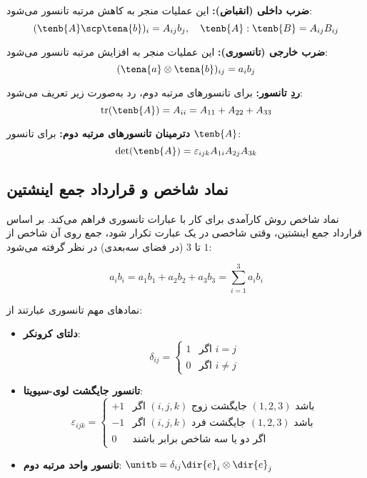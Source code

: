 \textbf{ضرب داخلی (انقباض):} این عملیات منجر به کاهش مرتبه تانسور می‌شود:
\begin{equation}
	(\tenb{A} \scp \tena{b})_i = A_{ij} b_j, \quad \tenb{A} : \tenb{B} = A_{ij} B_{ij}
\end{equation}

\textbf{ضرب خارجی (تانسوری):} این عملیات منجر به افزایش مرتبه تانسور می‌شود:
\begin{equation}
	(\tena{a} \otimes \tena{b})_{ij} = a_i b_j
\end{equation}

\textbf{ردِ تانسور:} برای تانسورهای مرتبه دوم، رد به‌صورت زیر تعریف می‌شود:
\begin{equation}
	\text{tr}(\tenb{A}) = A_{ii} = A_{11} + A_{22} + A_{33}
\end{equation}

\textbf{دترمینان تانسورهای مرتبه دوم:} برای تانسور $\tenb{A}$:
\begin{equation}
	\det(\tenb{A}) = \varepsilon_{ijk} A_{1i} A_{2j} A_{3k}
\end{equation}

\subsection{نماد شاخص و قرارداد جمع اینشتین}

نماد شاخص روش کارآمدی برای کار با عبارات تانسوری فراهم می‌کند. بر اساس قرارداد جمع اینشتین، وقتی شاخصی در یک عبارت تکرار شود، جمع روی آن شاخص از $1$ تا $3$ (در فضای سه‌بعدی) در نظر گرفته می‌شود:

\begin{equation}
	a_i b_i = a_1 b_1 + a_2 b_2 + a_3 b_3 = \sum_{i=1}^{3} a_i b_i
\end{equation}

نمادهای مهم تانسوری عبارتند از:

\begin{itemize}
	\item \textbf{دلتای کرونکر}: 
	\begin{equation}
		\delta_{ij} = \begin{cases} 1 & \text{اگر } i = j \\ 0 & \text{اگر } i \neq j \end{cases}
	\end{equation}
	
	\item \textbf{تانسور جایگشت لوی-سیویتا}: 
	\begin{equation}
		\varepsilon_{ijk} = \begin{cases} 
		+1 & \text{اگر } (i,j,k) \text{ جایگشت زوج } (1,2,3) \text{ باشد} \\
		-1 & \text{اگر } (i,j,k) \text{ جایگشت فرد } (1,2,3) \text{ باشد} \\
		0 & \text{اگر دو یا سه شاخص برابر باشند}
		\end{cases}
	\end{equation}
	
	\item \textbf{تانسور واحد مرتبه دوم}: $\unitb = \delta_{ij} \dir{e}_i \otimes \dir{e}_j$
\end{itemize}

